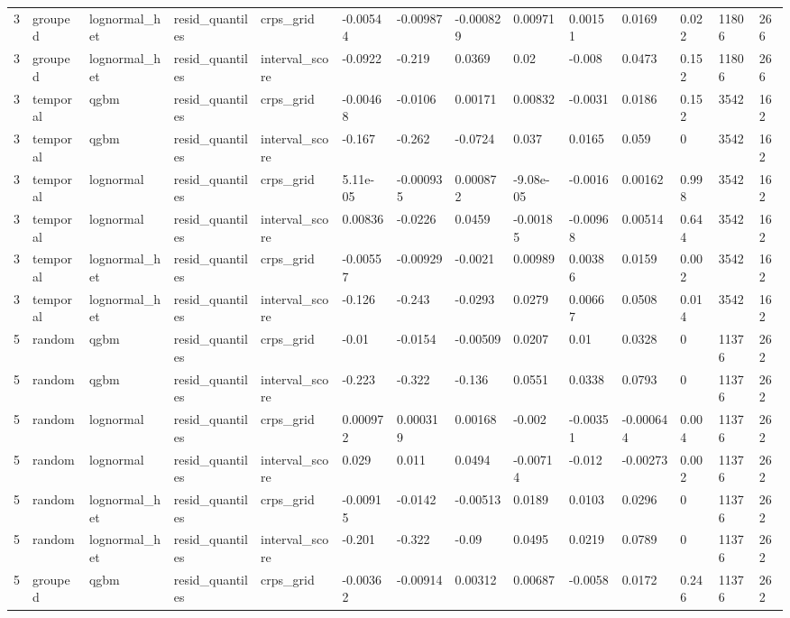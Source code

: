 \begin{tabular}{llllllllllllll}
3 & grouped & lognormal\_het & resid\_quantiles & crps\_grid & -0.00544 & -0.00987 & -0.000829 & 0.00971 & 0.00151 & 0.0169 & 0.022 & 11806 & 266 \\
3 & grouped & lognormal\_het & resid\_quantiles & interval\_score & -0.0922 & -0.219 & 0.0369 & 0.02 & -0.008 & 0.0473 & 0.152 & 11806 & 266 \\
3 & temporal & qgbm & resid\_quantiles & crps\_grid & -0.00468 & -0.0106 & 0.00171 & 0.00832 & -0.0031 & 0.0186 & 0.152 & 3542 & 162 \\
3 & temporal & qgbm & resid\_quantiles & interval\_score & -0.167 & -0.262 & -0.0724 & 0.037 & 0.0165 & 0.059 & 0 & 3542 & 162 \\
3 & temporal & lognormal & resid\_quantiles & crps\_grid & 5.11e-05 & -0.000935 & 0.000872 & -9.08e-05 & -0.0016 & 0.00162 & 0.998 & 3542 & 162 \\
3 & temporal & lognormal & resid\_quantiles & interval\_score & 0.00836 & -0.0226 & 0.0459 & -0.00185 & -0.00968 & 0.00514 & 0.644 & 3542 & 162 \\
3 & temporal & lognormal\_het & resid\_quantiles & crps\_grid & -0.00557 & -0.00929 & -0.0021 & 0.00989 & 0.00386 & 0.0159 & 0.002 & 3542 & 162 \\
3 & temporal & lognormal\_het & resid\_quantiles & interval\_score & -0.126 & -0.243 & -0.0293 & 0.0279 & 0.00667 & 0.0508 & 0.014 & 3542 & 162 \\
5 & random & qgbm & resid\_quantiles & crps\_grid & -0.01 & -0.0154 & -0.00509 & 0.0207 & 0.01 & 0.0328 & 0 & 11376 & 262 \\
5 & random & qgbm & resid\_quantiles & interval\_score & -0.223 & -0.322 & -0.136 & 0.0551 & 0.0338 & 0.0793 & 0 & 11376 & 262 \\
5 & random & lognormal & resid\_quantiles & crps\_grid & 0.000972 & 0.000319 & 0.00168 & -0.002 & -0.00351 & -0.000644 & 0.004 & 11376 & 262 \\
5 & random & lognormal & resid\_quantiles & interval\_score & 0.029 & 0.011 & 0.0494 & -0.00714 & -0.012 & -0.00273 & 0.002 & 11376 & 262 \\
5 & random & lognormal\_het & resid\_quantiles & crps\_grid & -0.00915 & -0.0142 & -0.00513 & 0.0189 & 0.0103 & 0.0296 & 0 & 11376 & 262 \\
5 & random & lognormal\_het & resid\_quantiles & interval\_score & -0.201 & -0.322 & -0.09 & 0.0495 & 0.0219 & 0.0789 & 0 & 11376 & 262 \\
5 & grouped & qgbm & resid\_quantiles & crps\_grid & -0.00362 & -0.00914 & 0.00312 & 0.00687 & -0.0058 & 0.0172 & 0.246 & 11376 & 262 \\

\end{tabular}
